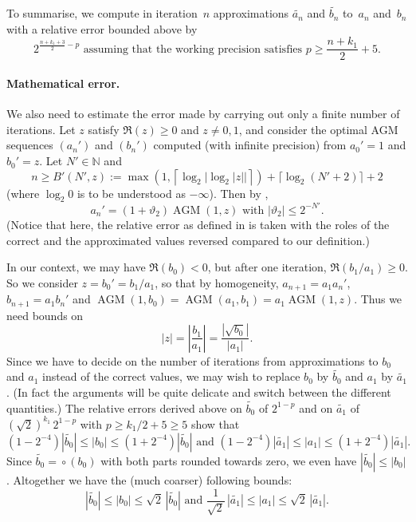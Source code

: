 \documentclass [11pt]{article}
\newcommand {\corr}[1]{{#1}}
\newcommand {\appro}[1]{\widetilde {#1}}
\newcommand {\round}{\operatorname {\circ}}
\newcommand {\N}{\mathbb N}
\renewcommand {\theta}{\vartheta}
\renewcommand {\leq}{\leqslant}
\renewcommand {\geq}{\geqslant}
\newcommand {\AGM}{\operatorname{AGM}}
\begin{document}
\noindent
To summarise, we compute in iteration~$n$ approximations $\appro {a_n}$
and $\appro {b_n}$ to~$a_n$ and~$b_n$ with a relative error bounded above by
\begin {equation}
\label {eq:agmprec}
2^{\frac {n + k_1 + 3}{2} - p}
\text { assuming that the working precision satisfies }
p \geq \frac {n + k_1}{2} + 5.
\end {equation}


\paragraph {Mathematical error.}

We also need to estimate the error made by carrying out only a finite number
of iterations. Let $z$ satisfy $\Re (z) \geq 0$ and $z \neq 0, 1$, and
consider the optimal AGM sequences $(a_n')$ and $(b_n')$ computed (with
infinite precision) from $a_0' = 1$ and $b_0' = z$. Let $N' \in \N$ and
\[
n \geq B' (N', z)
  := \max \left( 1, \left\lceil \log_2 \big| \log_2 |z| \big|
     \right\rceil \right)
        + \lceil \log_2 (N'+2) \rceil + 2
\]
(where $\log_2 0$ is to be understood as $- \infty$).
Then by \cite[Prop.~3.3, p.~88]{Dupont06},
\[
a_n' = (1 + \theta_2) \AGM (1, z)
\text { with }
|\theta_2| \leq 2^{-N'}.
\]
(Notice that here, the relative error as defined in
\cite[Def.~1.2, p.~20]{Dupont06} is taken with the roles of the correct
and the approximated values reversed compared to our definition.)

In our context, we may have $\Re (\corr {b_0}) < 0$, but after one iteration,
$\Re (\corr {b_1} / \corr {a_1}) \geq 0$. So we consider
$\corr {z} = b_0' = \corr {b_1} / \corr {a_1}$, so that by
homogeneity, $\corr {a_{n+1}} = \corr {a_1} a_n'$,
$\corr {b_{n+1}} = \corr {a_1} b_n'$ and
$\AGM (1, \corr {b_0}) = \AGM (\corr {a_1}, \corr {b_1})
= \corr {a_1} \AGM (1, \corr {z})$.
Thus we need bounds on
\[
|z|
= \left| \frac {\corr {b_1}}{\corr {a_1}} \right|
= \frac {|\sqrt {\corr {b_0}}|}{|\corr {a_1}|}.
\]
Since we have to decide on the number of iterations from approximations
to $b_0$ and $a_1$ instead of the correct values, we may wish to replace
$b_0$ by $\appro {b_0}$ and $a_1$ by $\appro {a_1}$. (In fact the
arguments will be quite delicate and switch between the different
quantities.)
The relative errors derived above on $\appro {b_0}$ of
$2^{1-p}$ and on $\appro {a_1}$ of $(\sqrt 2)^{k_1} \, 2^{1-p}$ with
$p \geq k_1 / 2 + 5 \geq 5$ show that
\[
\left( 1 - 2^{-4} \right) \left| \appro {b_0} \right|
\leq |b_0|
\leq \left( 1 + 2^{-4} \right) \left| \appro {b_0} \right|
\text { and }
\left( 1 - 2^{-4} \right) \left| \appro {a_1} \right|
\leq |a_1|
\leq \left( 1 + 2^{-4} \right) \left| \appro {a_1} \right|.
\]
Since $\appro {b_0} = \round (b_0)$ with both parts rounded towards zero,
we even have $\left| \appro {b_0} \right| \leq |b_0|$.
Altogether we have the (much coarser) following bounds:
\begin {equation}
\label {eq:agmabsb0a1}
\left| \appro {b_0} \right|
\leq |b_0|
\leq \sqrt 2 \, \left| \appro {b_0} \right|
\text { and }
\frac {1}{\sqrt 2} \, \left| \appro {a_1} \right|
\leq |a_1|
\leq \sqrt 2 \, \left| \appro {a_1} \right|.
\end {equation}
\end{document}
